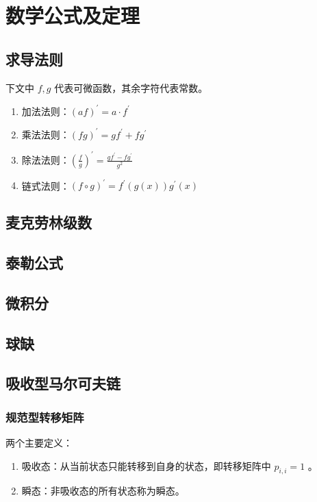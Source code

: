\documentclass{article}
\begin{document}
\section{数学公式及定理}
\subsection{求导法则}
下文中 $f,g$ 代表可微函数，其余字符代表常数。
\begin{enumerate}
    \item 加法法则：$(af)^{\prime} = a\cdot f^{\prime}$
    \item 乘法法则：$(fg)^{\prime}=gf^{\prime}+fg^{\prime}$
    \item 除法法则：$(\frac{f}{g})^{\prime}=\frac{gf^{\prime}-fg^{\prime}}{g^2}$
    \item 链式法则：$(f\circ g)^{\prime} = f^{\prime}(g(x))g^{\prime}(x)$
\end{enumerate}
\subsection{麦克劳林级数}

\subsection{泰勒公式}

\subsection{微积分}

\subsection{球缺}

\subsection{吸收型马尔可夫链}
\subsubsection{规范型转移矩阵}
两个主要定义：

\begin{enumerate}
    \item 吸收态：从当前状态只能转移到自身的状态，即转移矩阵中 $p_{i,i}=1$ 。
    \item 瞬态：非吸收态的所有状态称为瞬态。
\end{enumerate}
\end{document}
